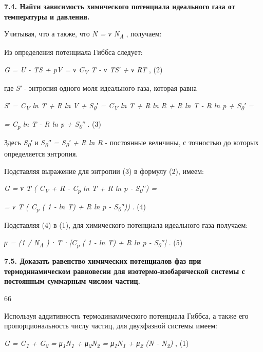 \textbf{7.4. Найти зависимость химического потенциала идеального газа от
температуры и давления.}

\solving{}

Учитывая, что %
а также, что \emph{N = ν N\textsubscript{A}} , получаем:


Из определения потенциала Гиббса следует:

\emph{G = U - TS + pV = ν C\textsubscript{V} T - ν TS′ + ν RT} , (2)

где \emph{S′} - энтропия одного моля идеального газа, которая равна

\emph{S′ = C\textsubscript{V} ln T + R ln V + S\textsubscript{0}′ =
C\textsubscript{V} ln T + R ln R + R ln T - R ln p + S\textsubscript{0}′
=}

\emph{= C\textsubscript{p} ln T - R ln p + S\textsubscript{0}′′} . (3)

Здесь \emph{S\textsubscript{0}′} и \emph{S\textsubscript{0}′′ =
S\textsubscript{0}′ + R ln R} - постоянные величины, с точностью до
которых определяется энтропия.

Подставляя выражение для энтропии (3) в формулу (2), имеем:

\emph{G = ν T ( C\textsubscript{V} + R - C\textsubscript{p} ln T + R ln
p - S\textsubscript{0}′′) =}

\emph{= ν T ( C\textsubscript{p} ( 1 - ln T) + R ln p -
S\textsubscript{0}′′))} . (4)

Подставляя (4) в (1), для химического потенциала идеального газа
получаем:

\emph{μ = (1 / N\textsubscript{A} ) ⋅ T ⋅ {[}C\textsubscript{p} ( 1 - ln
T) + R ln p - S\textsubscript{0}′′{]}} . (5)

\textbf{7.5. Доказать равенство химических потенциалов фаз при
термодинамическом равновесии для изотермо-изобарической системы с
постоянным суммарным числом частиц.}

\solving{}

66

Используя аддитивность термодинамического потенциала Гиббса, а также его
пропорциональность числу частиц, для двухфазной системы имеем:

\emph{G = G\textsubscript{1} + G\textsubscript{2} =
μ\textsubscript{1}N\textsubscript{1} +
μ\textsubscript{2}N\textsubscript{2} =
μ\textsubscript{1}N\textsubscript{1} + μ\textsubscript{2} (N -
N\textsubscript{2})} , (1)

